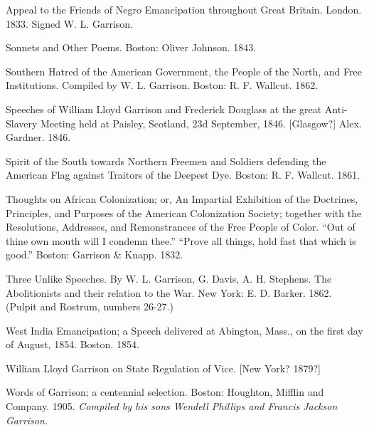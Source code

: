 \documentclass{book}
\begin{document}
Appeal to the Friends of Negro Emancipation throughout Great Britain. London. 1833. Signed W. L. Garrison.

Sonnets and Other Poems. Boston: Oliver Johnson. 1843.

Southern Hatred of the American Government, the People of the North, and Free Institutions. Compiled by W. L. Garrison. Boston: R. F. Wallcut. 1862.

Speeches of William Lloyd Garrison and Frederick Douglass at the great Anti-Slavery Meeting held at Paisley, Scotland, 23d September, 1846. {[}Glasgow?{]} Alex. Gardner. 1846.

Spirit of the South towards Northern Freemen and Soldiers defending the American Flag against Traitors of the Deepest Dye. Boston: R. F. Wallcut. 1861.

Thoughts on African Colonization; or, An Impartial Exhibition of the Doctrines, Principles, and Purposes of the American Colonization Society; together with the Resolutions, Addresses, and Remonstrances of the Free People of Color. “Out of thine own mouth will I condemn thee.” “Prove all things, hold fast that which is good.” Boston: Garrison \& Knapp. 1832.

Three Unlike Speeches. By W. L. Garrison, G. Davis, A. H. Stephens. The Abolitionists and their relation to the War. New York: E. D. Barker. 1862. (Pulpit and Rostrum, numbers 26-27.)

West India Emancipation; a Speech delivered at Abington, Mass., on the first day of August, 1854. Boston. 1854.

William Lloyd Garrison on State Regulation of Vice. {[}New York? 1879?{]}

Words of Garrison; a centennial selection. Boston: Houghton, Mifflin and Company. 1905. \emph{Compiled by his sons Wendell Phillips and Francis Jackson Garrison.}
\end{document}

